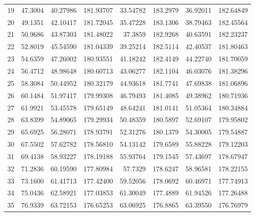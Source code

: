 \begin{table}[ht!]
{\begin{tabular}{@{}rrrrrrrr@{}}
19 & 47.3004 & 40.27986 & 181.93707 & 33.54782 & 183.2979 & 36.92011 & 182.64849 \\
20 & 49.1351 & 42.10417 & 181.72045 & 35.47228 & 183.1306 & 38.79463 & 182.45564 \\
21 & 50.9686 & 43.87303 & 181.48022 & 37.3859  & 182.9268 & 40.63591 & 182.23237 \\
22 & 52.8019 & 45.54590 & 181.04339 & 39.25214 & 182.5114 & 42.40537 & 181.80463 \\
23 & 54.6359 & 47.26002 & 180.93551 & 41.18242 & 182.4149 & 44.22740 & 181.70059 \\
24 & 56.4712 & 48.98648 & 180.60713 & 43.06277 & 182.1104 & 46.03076 & 181.38296 \\
25 & 58.3084 & 50.44952 & 180.32179 & 44.93618 & 181.7741 & 47.69838 & 181.06896 \\
26 & 60.1484 & 51.97417 & 179.99308 & 46.79493 & 181.4085 & 49.38962 & 180.71936 \\
27 & 61.9921 & 53.45578 & 179.65149 & 48.64241 & 181.0141 & 51.05364 & 180.34884 \\
28 & 63.8399 & 54.89065 & 179.29934 & 50.48359 & 180.5897 & 52.69107 & 179.95802 \\
29 & 65.6925 & 56.28071 & 178.93791 & 52.31276 & 180.1379 & 54.30005 & 179.54887 \\
30 & 67.5502 & 57.62782 & 178.56810 & 54.13142 & 179.6589 & 55.88228 & 179.12203 \\
31 & 69.4138 & 58.93227 & 178.19188 & 55.93764 & 179.1545 & 57.43697 & 178.67947 \\
32 & 71.2836 & 60.19590 & 177.80984 & 57.7329  & 178.6247 & 58.96581 & 178.22155 \\
33 & 73.1600 & 61.41713 & 177.42400 & 59.52056 & 178.0692 & 60.46971 & 177.74913 \\
34 & 75.0436 & 62.58921 & 177.03853 & 61.30049 & 177.4889 & 61.94526 & 177.26488 \\
35 & 76.9339 & 63.72153 & 176.65253 & 63.06925 & 176.8865 & 63.39550 & 176.76979 \\ \bottomrule
\end{tabular}%
}
\end{table}
\vfill
\clearpage


